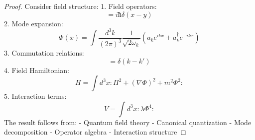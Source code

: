 \documentclass[12pt]{article}
\begin{document}
\begin{proof}
Consider field structure:
1. Field operators:
\begin{equation}
[\Phi(x),\Pi(y)] = iħ\delta(x-y)
\end{equation}
2. Mode expansion:
\begin{equation}
\Phi(x) = \int\frac{d^3k}{(2\pi)^3}\frac{1}{\sqrt{2\omega_k}}(a_ke^{ikx} + a_k^\dagger e^{-ikx})
\end{equation}
3. Commutation relations:
\begin{equation}
[a_k,a_{k'}^\dagger] = \delta(k-k')
\end{equation}
4. Field Hamiltonian:
\begin{equation}
H = \int d^3x :\Pi^2 + (\nabla\Phi)^2 + m^2\Phi^2:
\end{equation}
5. Interaction terms:
\begin{equation}
V = \int d^3x :\lambda\Phi^4:
\end{equation}
The result follows from:
- Quantum field theory
- Canonical quantization
- Mode decomposition
- Operator algebra
- Interaction structure
\end{proof}
\end{document}
